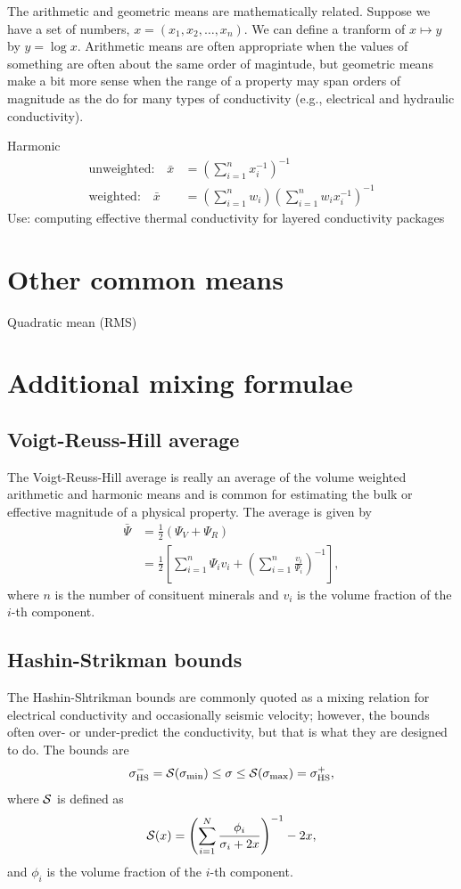 \documentclass[final,a4paper,12pt]{article}
\theoremstyle{definition}
\begin{document}
The arithmetic and geometric means are mathematically related.  Suppose we have
a set of numbers, $x = (x_1, x_2, \ldots, x_n)$.  We can define a tranform of
$x \mapsto y$ by $y = \log x$.  Arithmetic means
are often appropriate when the values of something are often about the same
order of magintude, but geometric means make a bit more sense when the range of
a property may span orders of magnitude as the do for many types of conductivity
(e.g., electrical and hydraulic conductivity).

Harmonic
\begin{align}
    \text{unweighted:} \quad \bar{x} &= \left( \sum_{i=1}^{n} x_i^{-1} \right)^{-1} \\
    \text{weighted:} \quad \bar{x} &= \left( \sum_{i=1}^{n} w_i \right)
        \left( \sum_{i=1}^{n} w_i x_i^{-1} \right)^{-1}
\end{align}
Use: computing effective thermal conductivity for layered conductivity packages

\section{Other common means}
Quadratic mean (RMS)

\section{Additional mixing formulae}
\subsection{Voigt-Reuss-Hill average}
The Voigt-Reuss-Hill average is really an average of the volume weighted
arithmetic and harmonic means and is common for estimating the bulk or effective
magnitude of a physical property.  The average is given by
\begin{align}
    \bar{\Psi} &= \frac{1}{2}(\Psi_V + \Psi_R) \\
    &= \frac{1}{2}\left[
    \sum_{i = 1}^n \Psi_i v_i +
    \left( \sum_{i = 1}^n \frac{v_i}{\Psi_i} \right)^{-1}
    \right],
\end{align}
where $n$ is the number of consituent minerals and $v_i$ is the volume fraction
of the $i$-th component.

\subsection{Hashin-Strikman bounds}
The Hashin-Shtrikman bounds are commonly quoted as a mixing relation for
electrical conductivity and occasionally seismic velocity; however, the bounds
often over- or under-predict the conductivity, but that is what they are
designed to do.  The bounds are
\begin{equation}
    \sigma_{\mathrm{HS}}^- = \mathcal{S}(\sigma_{\mathrm{min}}) \leq \sigma \leq
    \mathcal{S}(\sigma_{\mathrm{max}}) = \sigma_{\mathrm{HS}}^+,
\end{equation}
where $\mathcal{S}$ is defined as
\begin{equation}
    \mathcal{S}(x) =
    \Biggl( \sum_{i=1}^N \frac{\phi_i}{\sigma_i + 2x} \Biggr)^{-1} - 2x ,
\end{equation}
and $\phi_i$ is the volume fraction of the $i$-th component.
\end{document}
